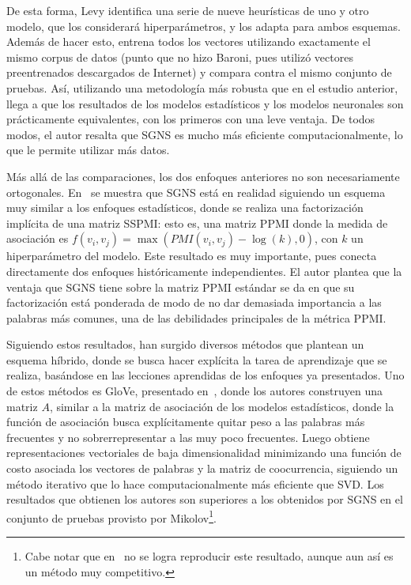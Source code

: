 De esta forma, Levy identifica una serie de nueve heurísticas de uno y otro modelo, que los
considerará hiperparámetros, y los adapta para ambos esquemas. Además de hacer esto, entrena todos
los vectores utilizando exactamente el mismo corpus de datos (punto que no hizo Baroni, pues utilizó
vectores preentrenados descargados de Internet) y compara contra el mismo conjunto de pruebas. Así,
utilizando una metodología más robusta que en el estudio anterior, llega a que los resultados de los
modelos estadísticos y los modelos neuronales son prácticamente equivalentes, con los primeros con
una leve ventaja. De todos modos, el autor resalta que SGNS es mucho más eficiente
computacionalmente, lo que le permite utilizar más datos.


Más allá de las comparaciones, los dos enfoques anteriores no son necesariamente
ortogonales. En~\cite{Levy2014a} se muestra que SGNS está en realidad siguiendo un esquema muy
similar a los enfoques estadísticos, donde se realiza una factorización implícita de una matriz
SSPMI\@: esto es, una matriz PPMI donde la medida de asociación es $f(v_i, v_j) = \max(PMI(v_i, v_j)
- \log(k), 0)$, con $k$ un hiperparámetro del modelo. Este resultado es muy importante, pues conecta
directamente dos enfoques históricamente independientes. El autor plantea que la ventaja que SGNS
tiene sobre la matriz PPMI estándar se da en que su factorización está ponderada de modo de no dar
demasiada importancia a las palabras más comunes, una de las debilidades principales de la métrica
PPMI\@.


Siguiendo estos resultados, han surgido diversos métodos que plantean un esquema híbrido, donde se
busca hacer explícita la tarea de aprendizaje que se realiza, basándose en las lecciones aprendidas
de los enfoques ya presentados. Uno de estos métodos es GloVe, presentado en~\cite{Pennington2014},
donde los autores construyen una matriz $A$, similar a la matriz de asociación de los modelos
estadísticos, donde la función de asociación busca explícitamente quitar peso a las palabras más
frecuentes y no sobrerrepresentar a las muy poco frecuentes. Luego obtiene representaciones
vectoriales de baja dimensionalidad minimizando una función de costo asociada los vectores de
palabras y la matriz de coocurrencia, siguiendo un método iterativo que lo hace computacionalmente
más eficiente que SVD\@. Los resultados que obtienen los autores son superiores a los obtenidos por
SGNS en el conjunto de pruebas provisto por Mikolov\footnote{Cabe notar que en~\cite{Levy2015} no se
logra reproducir este resultado, aunque aun así es un método muy competitivo.}.


